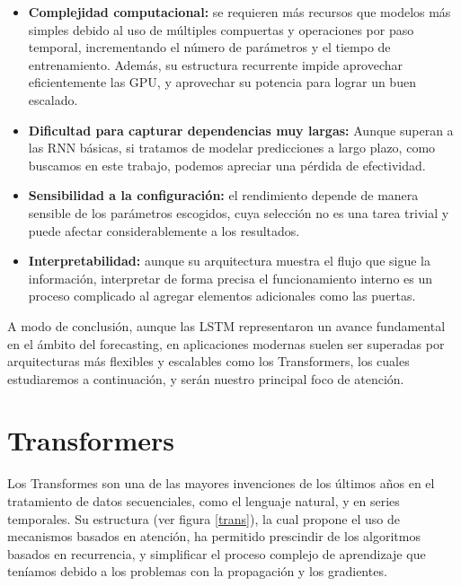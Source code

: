 \begin{itemize}
    \item \textbf{Complejidad computacional:} se requieren más recursos que modelos más simples debido al uso de múltiples compuertas y operaciones por paso temporal, incrementando el número de parámetros y el tiempo de entrenamiento. Además, su estructura recurrente impide aprovechar eficientemente las GPU, y aprovechar su potencia para lograr un buen escalado.

    \item \textbf{Dificultad para capturar dependencias muy largas:} Aunque superan a las RNN básicas, si tratamos de modelar predicciones a largo plazo, como buscamos en este trabajo, podemos apreciar una pérdida de efectividad.

    \item \textbf{Sensibilidad a la configuración:} el rendimiento depende de manera sensible de los parámetros escogidos, cuya selección no es una tarea trivial y puede afectar considerablemente a los resultados.

    \item \textbf{Interpretabilidad:} aunque su arquitectura muestra el flujo que sigue la información, interpretar de forma precisa el funcionamiento interno es un proceso complicado al agregar elementos adicionales como las puertas.

\end{itemize}

A modo de conclusión, aunque las LSTM representaron un avance fundamental en el ámbito del forecasting, en aplicaciones modernas suelen ser superadas por arquitecturas más flexibles y escalables como los Transformers, los cuales estudiaremos a continuación, y serán nuestro principal foco de atención.


\section{Transformers}

Los Transformes son una de las mayores invenciones de los últimos años en el tratamiento de datos secuenciales, como el lenguaje natural, y en series temporales. Su estructura (ver figura \ref{trans}), la cual propone el uso de mecanismos basados en atención, ha permitido prescindir de los algoritmos basados en recurrencia, y simplificar el proceso complejo de aprendizaje que teníamos debido a los problemas con la propagación y los gradientes.\\

